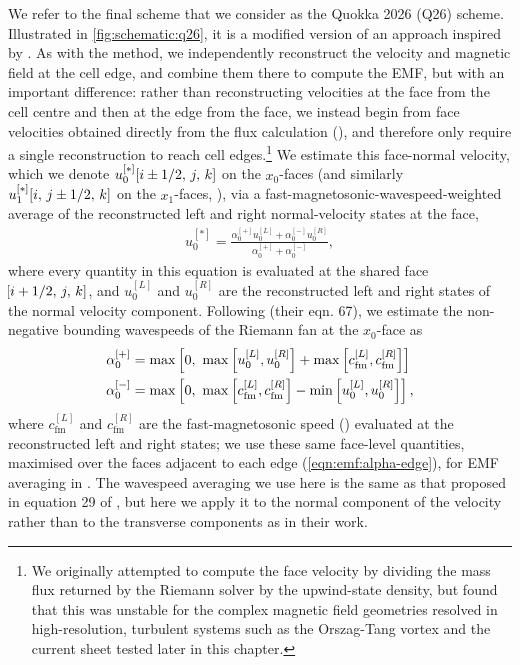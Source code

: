 We refer to the final scheme that we consider as the Quokka 2026 (Q26) scheme. Illustrated in \cref{fig:schematic:q26}, it is a modified version of an approach inspired by \citet{Mignone21a}. As with the  method, we independently reconstruct the velocity and magnetic field at the cell edge, and combine them there to compute the EMF, but with an important difference: rather than reconstructing velocities at the face from the cell centre and then at the edge from the face, we instead begin from face velocities obtained directly from the flux calculation (), and therefore only require a single reconstruction to reach cell edges.\footnote{
    We originally attempted to compute the face velocity by dividing the mass flux returned by the Riemann solver by the upwind-state density, but found that this was unstable for the complex magnetic field geometries resolved in high-resolution, turbulent systems such as the Orszag-Tang vortex and the current sheet tested later in this chapter.
} We estimate this face-normal velocity, which we denote $u_{0}^{[*]}\!\left[ i \pm 1/2,\,j,\,k \right]$ on the $x_0$-faces (and similarly $u_1^{[*]}\!\left[ i,\,j \pm 1/2,\,k \right]$ on the $x_1$-faces, \etc), via a fast-magnetosonic-wavespeed-weighted average of the reconstructed left and right normal-velocity states at the face,
\begin{align}
    u_{0}^{[*]}
        = \frac{\alpha_0^{[+]} u_{0}^{[L]} + \alpha_0^{[-]} u_{0}^{[R]}}{\alpha_0^{[+]} + \alpha_0^{[-]}}
    , \label{eqn:emf:q26-facevel}
\end{align}
where every quantity in this equation is evaluated at the shared face $\!\left[ i + 1/2,\,j,\,k \right]$, and $u_0^{[L]}$ and $u_0^{[R]}$ are the reconstructed left and right states of the normal velocity component. Following \citet{Miyoshi05a} (their eqn. 67), we estimate the non-negative bounding wavespeeds of the Riemann fan at the $x_0$-face as
\begin{align}
    \alpha_0^{[+]}
        &= \max\left[ 0,\ \max\left[ u_0^{[L]}, u_0^{[R]} \right] + \max\left[ c_\mathrm{fm}^{[L]}, c_\mathrm{fm}^{[R]} \right] \right]
    \\
    \alpha_0^{[-]}
        &= \max\left[ 0,\ \max\left[ c_\mathrm{fm}^{[L]}, c_\mathrm{fm}^{[R]} \right] - \min\left[ u_0^{[L]}, u_0^{[R]} \right] \right]
    , \label{eqn:emf:alpha-pm}
\end{align}
where $c_\mathrm{fm}^{[L]}$ and $c_\mathrm{fm}^{[R]}$ are the fast-magnetosonic speed () evaluated at the reconstructed left and right states; we use these same face-level quantities, maximised over the faces adjacent to each edge (\cref{eqn:emf:alpha-edge}), for EMF averaging in . The wavespeed averaging we use here is the same as that proposed in equation 29 of \citet{Mignone21a}, but here we apply it to the normal component of the velocity rather than to the transverse components as in their work.

